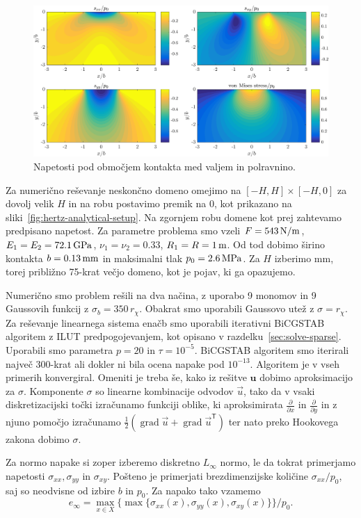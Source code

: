 \documentclass[12pt,a4paper,twoside]{article}
\theoremstyle{definition} %
\theoremstyle{plain} %
\numberwithin{equation}{section}
\newcommand{\T}{\mathsf{T}}
\newcommand{\grad}{\operatorname{grad}}
\renewcommand{\b}{\boldsymbol}
\newcommand{\dpar}[2]{\ensuremath{\frac{\partial #1}{\partial #2}}}
\newcommand{\vu}{\vec{u}}
\begin{document}
\begin{figure}[h]
  \centering
  \includegraphics[width=\textwidth]{images/hertzian_analytical.png}
  \caption{Napetosti pod območjem kontakta med valjem in polravnino.}
  \label{fig:hertz-analytical}
\end{figure}

Za numerično reševanje neskončno domeno omejimo na $[-H, H] \times [-H, 0]$ za dovolj velik $H$
in na robu postavimo premik na 0, kot prikazano na sliki~\ref{fig:hertz-analytical-setup}. Na
zgornjem robu domene kot prej zahtevamo predpisano napetost.  Za parametre problema smo vzeli $F =
\unit[543]{N/m}$, $E_1 = E_2 = \unit[72.1]{GPa}$, $\nu_1 = \nu_2 = 0.33$, $R_1 = R = \unit[1]{m}$.
Od tod dobimo širino kontakta $b = \unit[0.13]{mm}$ in maksimalni tlak $p_0 = \unit[2.6]{MPa}$.
Za $H$ izberimo \unit[10]{mm}, torej približno 75-krat večjo domeno, kot je pojav, ki ga opazujemo.

Numerično smo problem rešili na dva načina, z uporabo 9 monomov in 9 Gaussovih funkcij z $\sigma_b =
350\,r_\chi$. Obakrat smo uporabili Gaussovo utež z $\sigma = r_\chi$. Za reševanje linearnega
sistema enačb smo uporabili iterativni BiCGSTAB algoritem z ILUT predpogojevanjem, kot opisano v
razdelku~\ref{sec:solve-sparse}. Uporabili smo parametra $p=20$ in $\tau = 10^{-5}$. BiCGSTAB
algoritem smo iterirali največ 300-krat ali dokler ni bila ocena napake pod $10^{-13}$. Algoritem je
v vseh primerih konvergiral. Omeniti je treba še, kako iz rešitve $\b{u}$ dobimo aproksimacijo za
$\sigma$. Komponente $\sigma$ so linearne kombinacije odvodov $\vu$, tako da v vsaki
diskretizacijski točki izračunamo funkciji oblike, ki aproksimirata $\dpar{}{x}$ in $\dpar{}{y}$
in z njuno pomočjo izračunamo $\frac12 (\grad\vu + \grad\vu^\T)$ ter nato preko Hookovega zakona
dobimo $\sigma$.

Za normo napake si zoper izberemo diskretno $L_\infty$ normo, le da tokrat
primerjamo napetosti $\sigma_{xx}, \sigma_{yy}$ in $\sigma_{xy}$. Pošteno je primerjati
brezdimenzijske količine $\sigma_{xx}/p_0$, saj so neodvisne od izbire $b$ in $p_0$.
Za napako tako vzamemo
\[
  e_\infty = \max_{x\in X} \{\max\{\sigma_{xx}(x), \sigma_{yy}(x), \sigma_{xy}(x) \}\} / p_0.
\]
\end{document}

